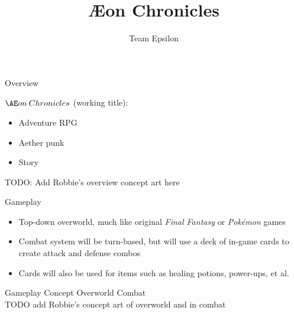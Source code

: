 \documentclass{teamepsilon}
\title{{\AE}on Chronicles}
\author{Team Epsilon}
\institute{Colorado School of Mines}
\begin{document}
\begin{frame}{Overview}
    \begin{minipage}{0.55\textwidth}
        $\AE on\:Chronicles$ (working title):
        \begin{itemize}
            \item Adventure RPG
            \item Aether punk
            \item Story
        \end{itemize}
    \end{minipage}%
    \begin{minipage}{0.45\textwidth}
        TODO: Add Robbie's overview concept art here
    \end{minipage}
\end{frame}

\begin{frame}{Gameplay}
    \begin{itemize}
        \item Top-down overworld, much like original \textit{Final Fantasy}
            or \textit{Pok\'emon} games
        \item Combat system will be turn-based, but will use a deck of in-game
            cards to create attack and defense combos
        \item Cards will also be used for items such as healing potions,
            power-ups, et al.
    \end{itemize}
\end{frame}

\begin{frame}{Gameplay Concept}
    Overworld \hfill Combat \\
    TODO add Robbie's concept art of overworld and in combat
\end{frame}
\end{document}
